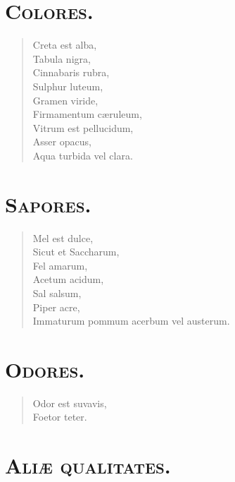 \section*{\textsc{Colores.}}


\begin{verse}

  Creta est alba,\\
  Tabula nigra,\\
  Cinnabaris rubra,\\
  Sulphur luteum,\\
  Gramen viride,\\
  Firmamentum cæruleum,\\
  Vitrum est pellucidum,\\
  Asser opacus,\\
  Aqua turbida vel clara.\\
\end{verse}



\section*{\textsc{Sapores.}}


\begin{verse}

  Mel est dulce,\\
  Sicut et Saccharum,\\
  Fel amarum,\\
  Acetum acidum,\\
  Sal salsum,\\
  Piper acre,\\
  Immaturum pommum acerbum vel austerum.\\
\end{verse}

\section*{\textsc{Odores.}}


\begin{verse}

  Odor est suvavis,\\
  Foetor teter.\\
\end{verse}

\section*{\textsc{Aliæ qualitates.}}


